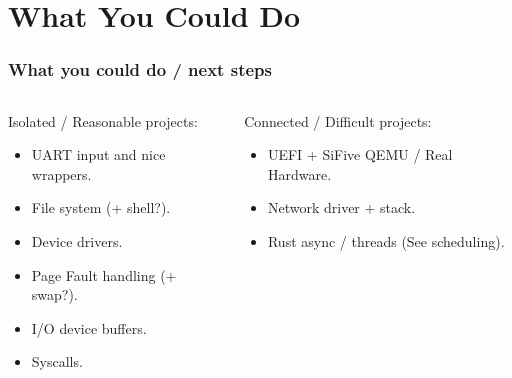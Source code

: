 \documentclass{beamer}
\begin{document}
\section{What You Could Do}
\begin{frame}
  \frametitle{What you could do / next steps}
  \begin{columns}
    \begin{column}{0.5\textwidth}
      Isolated / Reasonable projects:
      \begin{itemize}
      \item UART input and nice wrappers.\\
      \item File system (+ shell?).\\
      \item Device drivers.\\
      \item Page Fault handling (+ swap?).\\
      \item I/O device buffers.\\
      \item Syscalls.
      \end{itemize}
    \end{column}
    \begin{column}{0.5\textwidth}
      Connected / Difficult projects:
      \begin{itemize}
      \item UEFI + SiFive QEMU / Real Hardware.\\
      \item Network driver + stack.\\
      \item Rust async / threads (See scheduling).
      \end{itemize}
    \end{column}
  \end{columns}
\end{frame}
\end{document}
